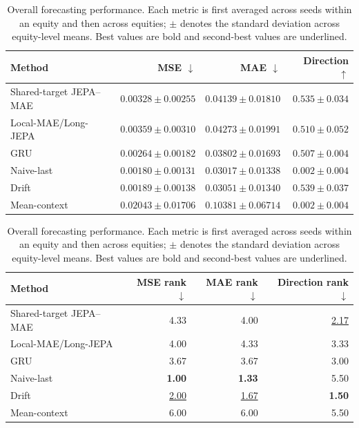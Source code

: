 \begin{table}[t]
\centering
\small
\caption{Overall forecasting performance. Each metric is first averaged across seeds within an equity and then across equities; $\pm$ denotes the standard deviation across equity-level means. Best values are bold and second-best values are underlined.}
\label{tab:main_metrics}
\begin{tabular}{lrrr}
\toprule
Method & MSE $\downarrow$ & MAE $\downarrow$ & Direction $\uparrow$ \\
\midrule
Shared-target JEPA--MAE & $0.00328 \pm 0.00255$ & $0.04139 \pm 0.01810$ & \underline{$0.535 \pm 0.034$} \\
Local-MAE/Long-JEPA & $0.00359 \pm 0.00310$ & $0.04273 \pm 0.01991$ & $0.510 \pm 0.052$ \\
GRU & $0.00264 \pm 0.00182$ & $0.03802 \pm 0.01693$ & $0.507 \pm 0.004$ \\
Naive-last & \textbf{$0.00180 \pm 0.00131$} & \textbf{$0.03017 \pm 0.01338$} & $0.002 \pm 0.004$ \\
Drift & \underline{$0.00189 \pm 0.00138$} & \underline{$0.03051 \pm 0.01340$} & \textbf{$0.539 \pm 0.037$} \\
Mean-context & $0.02043 \pm 0.01706$ & $0.10381 \pm 0.06714$ & $0.002 \pm 0.004$ \\
\bottomrule
\end{tabular}
\par\medskip
\begin{tabular}{lrrr}
\toprule
Method & MSE rank $\downarrow$ & MAE rank $\downarrow$ & Direction rank $\downarrow$ \\
\midrule
Shared-target JEPA--MAE & 4.33 & 4.00 & \underline{2.17} \\
Local-MAE/Long-JEPA & 4.00 & 4.33 & 3.33 \\
GRU & 3.67 & 3.67 & 3.00 \\
Naive-last & \textbf{1.00} & \textbf{1.33} & 5.50 \\
Drift & \underline{2.00} & \underline{1.67} & \textbf{1.50} \\
Mean-context & 6.00 & 6.00 & 5.50 \\
\bottomrule
\end{tabular}
\end{table}
